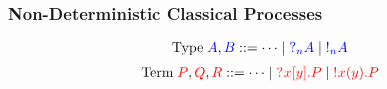 \documentclass[xcolor={dvipsnames}]{beamer}
\begin{document}
\begin{frame}
{\begin{center}
\begin{proofbox}[1]
        \SYM{\with}
      \end{proofbox}
    \end{center}
  }
\end{frame}

\begin{frame}
  \frametitle{Non-Deterministic Classical Processes}
  \[
    \text{Type} \; \tm{A}, \tm{B} ::= \dots \mid \tm{\give[n]{A}} \mid \tm{\take[n]{A}}
  \]
  \[\!
    \begin{aligned}
      \text{Term} \; {\color{tm}P}, {\color{tm}Q}, {\color{tm}R} ::= \dots
      \mid {\color{tm}\give{x[y].P}}
      \mid {\color{tm}\take{x(y).P}}
    \end{aligned}
  \]


  \begin{center}
    \begin{proofbox}[1]
      \SYM{\give[1]{}}
    \end{proofbox}
    \begin{proofbox}[1]
      \SYM{\take[1]{}}
    \end{proofbox}
  \end{center}

  \begin{proofblock}[1]
  \end{proofblock}
  \begin{proofblock}[1]
  \end{proofblock}
\end{frame}
\end{document}
